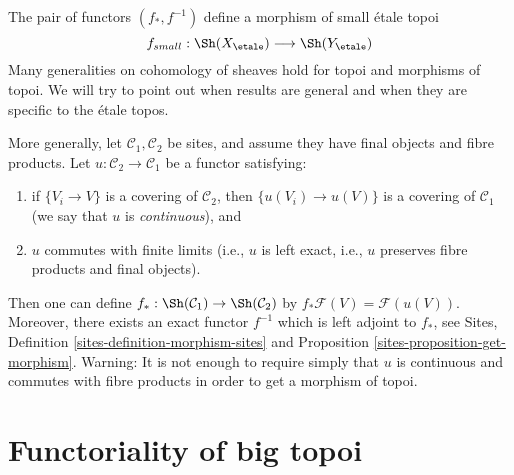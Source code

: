 \noindent
The pair of functors $(f_*, f^{-1})$ define a morphism of small \'etale topoi
$$
f_{small} :
\Sh(X_\etale)
\longrightarrow
\Sh(Y_\etale)
$$
Many generalities on cohomology of sheaves hold for topoi and
morphisms of topoi. We will try to point out when results are
general and when they are specific to the \'etale topos.

\begin{remark}
\label{remark-functoriality-general}
More generally, let $\mathcal{C}_1, \mathcal{C}_2$ be sites, and
assume they have final objects and fibre products. Let
$u: \mathcal{C}_2 \to \mathcal{C}_1$ be a functor satisfying:
\begin{enumerate}
\item if $\{V_i \to V\}$ is a covering of $\mathcal{C}_2$, then
$\{u(V_i) \to u(V)\}$ is a covering of $\mathcal{C}_1$ (we
say that $u$ is {\it continuous}), and
\item $u$ commutes with finite limits (i.e., $u$ is left exact, i.e.,
$u$ preserves fibre products and final objects).
\end{enumerate}
Then one can define
$f_*: \Sh(\mathcal{C}_1) \to \Sh(\mathcal{C}_2)$
by $ f_* \mathcal{F}(V) = \mathcal{F}(u(V))$.
Moreover, there exists an exact functor $f^{-1}$ which
is left adjoint to $f_*$, see
Sites, Definition \ref{sites-definition-morphism-sites} and
Proposition \ref{sites-proposition-get-morphism}.
Warning: It is not enough to require simply that $u$ is continuous
and commutes with fibre products in order to get a morphism of topoi.
\end{remark}




\section{Functoriality of big topoi}
\label{section-functoriality-big-topoi}

